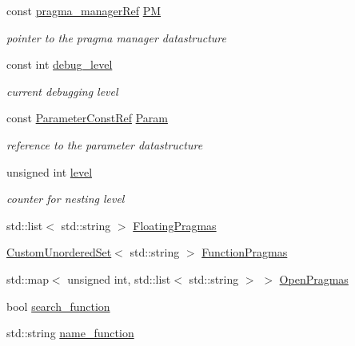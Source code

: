\begin{DoxyCompactItemize}
\item 
const \hyperlink{pragma__manager_8hpp_a6eb2deb9c5e77014dd1702c2971b1921}{pragma\+\_\+manager\+Ref} \hyperlink{classPragmaParser_a6972c78ee4e9f7bef88a70df69118660}{PM}
\begin{DoxyCompactList}\small\item\em pointer to the pragma manager datastructure \end{DoxyCompactList}\item 
const int \hyperlink{classPragmaParser_a9f08edfb28626e742354f50b6d1b9109}{debug\+\_\+level}
\begin{DoxyCompactList}\small\item\em current debugging level \end{DoxyCompactList}\item 
const \hyperlink{Parameter_8hpp_a37841774a6fcb479b597fdf8955eb4ea}{Parameter\+Const\+Ref} \hyperlink{classPragmaParser_a29c814a59a2860e1cd13ec5c5847ad0e}{Param}
\begin{DoxyCompactList}\small\item\em reference to the parameter datastructure \end{DoxyCompactList}\item 
unsigned int \hyperlink{classPragmaParser_afd2c745d8eb46b37724f5741721bf891}{level}
\begin{DoxyCompactList}\small\item\em counter for nesting level \end{DoxyCompactList}\item 
std\+::list$<$ std\+::string $>$ \hyperlink{classPragmaParser_aba0369bb6f32165f81bdea66717484fc}{Floating\+Pragmas}
\item 
\hyperlink{classCustomUnorderedSet}{Custom\+Unordered\+Set}$<$ std\+::string $>$ \hyperlink{classPragmaParser_aec5893ea5d5f9ed2bab54bdbb5373f60}{Function\+Pragmas}
\item 
std\+::map$<$ unsigned int, std\+::list$<$ std\+::string $>$ $>$ \hyperlink{classPragmaParser_a9fab2866a8697ebec477bda192a1ce85}{Open\+Pragmas}
\item 
bool \hyperlink{classPragmaParser_a6cb7cee0dfb439e15f01bef38706dd3c}{search\+\_\+function}
\item 
std\+::string \hyperlink{classPragmaParser_a3f6eb9715243421172eef37a8db6cc0f}{name\+\_\+function}
\end{DoxyCompactItemize}
